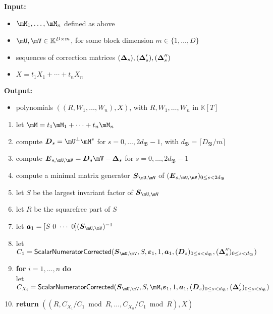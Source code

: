 \documentclass[12pt]{article}
\newcommand{\mat}[1]{\bm{\MakeUppercase{#1}}} %
\newcommand{\row}[1]{\bm{\MakeLowercase{#1}}} %
\newcommand{\col}[1]{\bm{\MakeLowercase{#1}}} %
\newcommand{\mainalgoname}{\mathsf{ BlockParametrization}}
\newcommand{\lf}{X}
\def\K{\mathbb{K}}
\def\K {\ensuremath{\mathbb{K}}}
\begin{document}
\begin{algorithm}[H]
	\caption{$\mainalgoname{\sf Residual}(\mM_1,\dots,\mM_n,\mU,\mV,(\mat{\Delta}_s),(\mat{\Delta}'_s),(\mat{\Delta}''_s),\lf)$}
	{\bf Input:} \vspace{-0.5em}
	\begin{itemize}
	\item $\mM_1,\dots,\mM_n$ defined as above
	\item  $\mU,\mV \in \mathbb{K}^{D \times m}$, for some block dimension  $m \in \{1,\dots,D\}$
        \item sequences of correction matrices $(\mat{\Delta}_s),(\mat{\Delta}'_s),(\mat{\Delta}''_s)$
        \item $\lf =t_1 X_1 + \cdots + t_n X_n$
	\end{itemize}
	    {\bf Output:}  \vspace{-0.5em}
        \begin{itemize}
        \item  polynomials $((R,W_1,\dots,W_n),\lf)$, with $R,W_1,\dots,W_n$ in $\K[T]$
        \end{itemize}
  \begin{enumerate}
  \item\label{residualstep1}   let $\mM = t_1 \mM_1 + \cdots + t_n \mM_n$
  \item\label{residualstep3} { compute $\mat{D}_s = \mU^{\perp}\mM^s$ for $s=0,\dots,2d_\mathfrak{B}-1$, with $d_\mathfrak{B} = \lceil D_\mathfrak{B}/m \rceil$}
  \item\label{residualstep4} { compute $\mat{E}_{s,\mU,\mV}= \mat{D}_s\mV-\mat{\Delta}_s$ for $s=0,\dots, 2d_\mathfrak{B}-1$}
  \item\label{residualstep5} { compute a minimal matrix generator $\mat{S}_{\mU,\mV}$ of $(\mat{E}_{s,\mU,\mV})_{0 \le s < 2d_\mathfrak{B}}$}
  \item\label{residualstep6} { let $S$ be the largest invariant factor of $\mat{S}_{\mU,\mV}$}
  \item\label{residualstep7} { let $R$ be  the squarefree part  of $S$}
  \item\label{residualstep8} { let $\row{a}_1 = [S~0 ~\cdots~ 0] (\mat{S}_{\mU,\mV})^{-1}$}
  \item\label{residualstep9}  let $C_1 = \mathsf{{\sf ScalarNumeratorCorrected}}(\mat{S}_{\mU,\mV}, S, \col{\varepsilon}_1, 1, \row{a}_1,  (\mat{D}_s)_{0 \le s < d_\mathfrak{B}}, (\mat{\Delta}''_s)_{0 \le s < d_\mathfrak{B}})$
  \item\label{residualstep10} \textbf{for} $i=1,\dots,n$ \textbf{do} \\
    \phantom{for}let $C_{X_i} = \mathsf{{\sf ScalarNumeratorCorrected}}(\mat{S}_{\mU,\mV},S, \mM_i\col{\varepsilon}_1, 1, \row{a}_1, (\mat{D}_s)_{0 \le s < d_\mathfrak{B}}, (\mat{\Delta}'_s)_{0 \le s < d_\mathfrak{B}})$
\item\label{residualstep11}     \textbf{return} $((R, C_{X_1}/ C_1 \bmod R, \dots, C_{X_n}/ C_{1} \bmod R),\lf)$
  \end{enumerate}  \label{algo:block-sparse-fglm-residual}
\end{algorithm}
\end{document}
